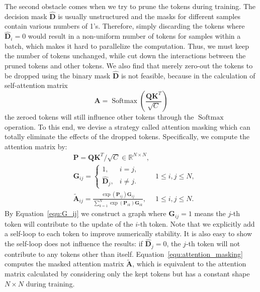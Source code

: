 \documentclass{article}
\DeclareMathOperator{\softmax}{Softmax}
\begin{document}
The second obstacle comes when we try to prune the tokens during training. The decision mask $\hat{\mathbf{D}}$ is usually unstructured and the masks for different samples contain various numbers of 1's. Therefore, simply discarding the tokens where $\hat{\mathbf{D}}_i=0$ would result in a non-uniform number of tokens for samples within a batch,
which makes it hard to parallelize the computation.
Thus, we must keep the number of tokens unchanged, while cut down the interactions between the pruned tokens and other tokens. We also find that merely zero-out the tokens to be dropped using the binary mask $\hat{\mathbf{D}}$ is not feasible, because in the calculation of self-attention matrix~\cite{vaswani2017attention}
\begin{equation}
    \mathbf{A} = \softmax\left(\frac{\mathbf{Q}\mathbf{K}^T}{\sqrt{C}}\right)
\end{equation}
the zeroed tokens will still influence other tokens through the $\softmax$ operation. To this end, we devise a strategy called attention masking which can totally eliminate the effects of the dropped tokens. Specifically, we compute the attention matrix by:
\begin{align}
    &\mathbf{P} = \mathbf{Q}\mathbf{K}^T/\sqrt{C} \in \mathbb{R}^{N\times N},\\
    &\mathbf{G}_{ij} = 
    \begin{cases}
    1,& i=j,\\
    \hat{\mathbf{D}}_j,& i\neq j.
    \end{cases}& 1\le i,j\le N,\label{equ:G_ij}\\
    &\tilde{\mathbf{A}}_{ij} =  \frac{\exp(\mathbf{P}_{ij})\mathbf{G}_{ij}}{\sum_{k=1}^N\exp(\mathbf{P}_{ik})\mathbf{G}_{ik}},& 1\le i,j\le N.\label{equ:attention_masking}
\end{align}
By Equation~\eqref{equ:G_ij} we construct a graph where $\mathbf{G}_{ij}=1$ means the $j$-th token will contribute to the update of the $i$-th token. Note that we explicitly add a self-loop to each token to improve numerically stability. It is also easy to show the self-loop does not influence the results: if $\hat{\mathbf{D}}_j=0$, the $j$-th token will not contribute to any tokens other than itself. Equation~\eqref{equ:attention_masking} computes the masked attention matrix $\tilde{\mathbf{A}}$, which is equivalent to the attention matrix calculated by considering only the kept tokens but has a constant shape $N\times N$ during training.
\end{document}

